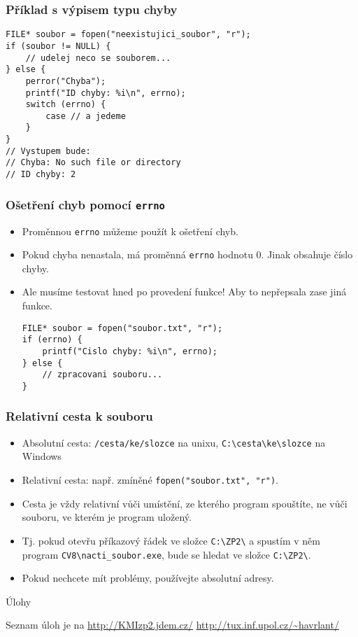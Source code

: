 \documentclass{beamer}
\newenvironment{itemizex}%
  {\large \begin{itemize}%
    \setlength{\itemsep}{8pt}%
    \setlength{\parskip}{8pt}}%
  {\end{itemize}}
\begin{document}
\begin{frame}[t,fragile]\frametitle{Příklad s výpisem typu chyby} 
\begin{verbatim} 
FILE* soubor = fopen("neexistujici_soubor", "r");
if (soubor != NULL) {
    // udelej neco se souborem...
} else {
    perror("Chyba");
    printf("ID chyby: %i\n", errno);
    switch (errno) {
        case // a jedeme
    }
}
// Vystupem bude:
// Chyba: No such file or directory
// ID chyby: 2
\end{verbatim}
\end{frame}


\begin{frame}[t,fragile]\frametitle{Ošetření chyb pomocí \texttt{errno}} 
    \begin{itemizex}
        \item Proměnnou \texttt{errno} můžeme použít k ošetření chyb.
        \item Pokud chyba nenastala, má proměnná \texttt{errno} hodnotu 0. Jinak obsahuje číslo chyby. 
        \item Ale musíme testovat hned po provedení funkce! Aby to nepřepsala zase jiná funkce.
\begin{verbatim} 
FILE* soubor = fopen("soubor.txt", "r");
if (errno) {
    printf("Cislo chyby: %i\n", errno);
} else {
    // zpracovani souboru...
}
\end{verbatim}
    \end{itemizex}
\end{frame}


\begin{frame}[t,fragile]\frametitle{Relativní cesta k souboru} 
 \begin{itemizex}
     \item Absolutní cesta: \texttt{/cesta/ke/slozce} na unixu, \texttt{C:\textbackslash cesta\textbackslash ke\textbackslash slozce} na Windows
     \item Relativní cesta: např. zmíněné \texttt{fopen("soubor.txt", "r")}.
     \item Cesta je vždy relativní vůči umístění, ze kterého program spouštíte, ne vůči souboru, ve kterém je program uložený.
     \item Tj. pokud otevřu příkazový řádek ve složce \texttt{C:\textbackslash ZP2\textbackslash} a spustím v něm program \texttt{CV8\textbackslash nacti\_soubor.exe}, bude se hledat ve složce \texttt{C:\textbackslash ZP2\textbackslash}. 
     \item Pokud nechcete mít problémy, používejte absolutní adresy. 
 \end{itemizex}
\end{frame}


\begin{frame}[t,fragile]{Úlohy}
\begin{center}
\vskip 1cm
{\Large Seznam úloh je na \url{http://KMIzp2.jdem.cz/}}
\vskip 2cm
\url{http://tux.inf.upol.cz/~havrlant/}
\end{center}
\end{frame}
\end{document}
